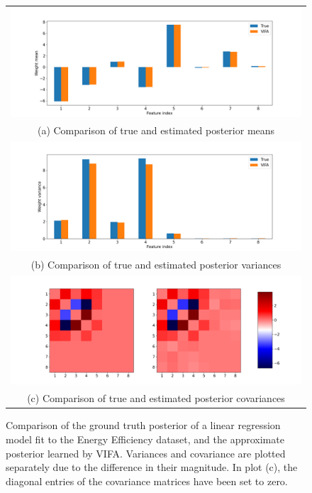 \documentclass[msc,deptreport.inf]{infthesis} %
\begin{document}
\begin{figure}[!htbp] 
	\begin{tabular}{c}
		\includegraphics[width=140mm]{plots/energy_efficiency_posterior_mean.png} \\
		(a) Comparison of true and estimated posterior means \\[6pt] 
		 \includegraphics[width=140mm]{plots/energy_efficiency_posterior_variance.png} \\
		(b) Comparison of true and estimated posterior variances \\[6pt] 
		\includegraphics[width=140mm]{plots/energy_efficiency_posterior_covariance.png} \\
		(c) Comparison of true and estimated posterior covariances \\[6pt] 
	\end{tabular}
	\caption{Comparison of the ground truth posterior of a linear regression model fit to the Energy Efficiency dataset, and the approximate posterior learned by VIFA. Variances and covariance are plotted separately due to the difference in their magnitude. In plot (c), the diagonal entries of the covariance matrices have been set to zero.}
	\label{fig:posterior_energy_efficiency}
\end{figure}
\end{document}
